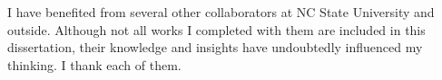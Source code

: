 \begin{acknowledgements}
I have benefited from several other collaborators at NC State University and outside. 
Although not all works I completed with them are included in this dissertation, their knowledge and insights have undoubtedly influenced
my thinking. 
I thank each of them. 
%

\end{acknowledgements}

